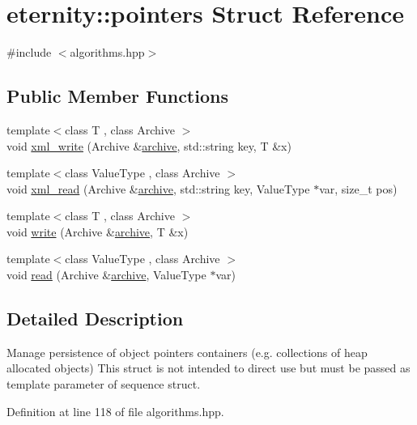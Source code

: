 \hypertarget{structeternity_1_1pointers}{}\section{eternity\+:\+:pointers Struct Reference}
\label{structeternity_1_1pointers}


{\ttfamily \#include $<$algorithms.\+hpp$>$}

\subsection*{Public Member Functions}
\begin{DoxyCompactItemize}
\item 
{\footnotesize template$<$class T , class Archive $>$ }\\void \hyperlink{structeternity_1_1pointers_a9ac5397bcf7d4e363f80c325b86e7966}{xml\+\_\+write} (Archive \&\hyperlink{classeternity_1_1archive}{archive}, std\+::string key, T \&x)
\item 
{\footnotesize template$<$class Value\+Type , class Archive $>$ }\\void \hyperlink{structeternity_1_1pointers_a82633874b86bdf07241befe07601fa10}{xml\+\_\+read} (Archive \&\hyperlink{classeternity_1_1archive}{archive}, std\+::string key, Value\+Type $\ast$var, size\+\_\+t pos)
\item 
{\footnotesize template$<$class T , class Archive $>$ }\\void \hyperlink{structeternity_1_1pointers_a5b2f7a5240aa5f6b19b3e615886ae5a3}{write} (Archive \&\hyperlink{classeternity_1_1archive}{archive}, T \&x)
\item 
{\footnotesize template$<$class Value\+Type , class Archive $>$ }\\void \hyperlink{structeternity_1_1pointers_a393c2b0b219bf16b8fcc372aaa19f185}{read} (Archive \&\hyperlink{classeternity_1_1archive}{archive}, Value\+Type $\ast$var)
\end{DoxyCompactItemize}


\subsection{Detailed Description}
Manage persistence of object pointers containers (e.\+g. collections of heap allocated objects) This struct is not intended to direct use but must be passed as template parameter of sequence struct. 

Definition at line 118 of file algorithms.\+hpp.



